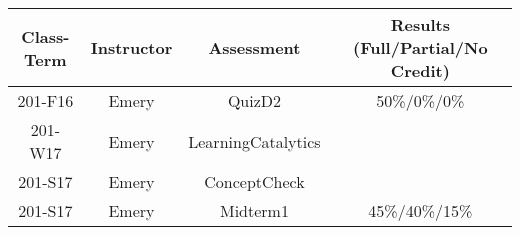 \begin{outcomes}
	\begin{center}
		\begin{tabular}{cccc}
			\hline\hline
                Class-Term & Instructor & Assessment & Results (Full/Partial/No Credit) \\
			\hline
                201-F16 & Emery & QuizD2 & 50\%/0\%/0\%\\
                201-W17 & Emery & LearningCatalytics &  \\
                201-S17 & Emery & ConceptCheck &  \\
                201-S17 & Emery & Midterm1 & 45\%/40\%/15\%\\
			\hline
		\end{tabular}
	\end{center}
\end{outcomes}

\begin{comments}


	
\end{comments}